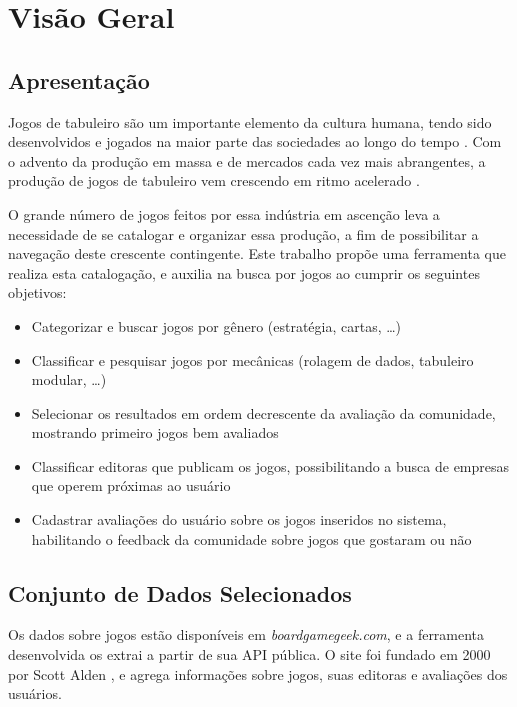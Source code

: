 \documentclass[hidelinks,12pt,article,twocolumn,brazil]{abntex2}
\def\bgg{\textit{boardgamegeek.com}}
\begin{document}
\imprimircapa

\section{Visão Geral}

\subsection{Apresentação}

Jogos de tabuleiro são um importante elemento da cultura humana, tendo sido desenvolvidos e jogados na maior parte das sociedades ao longo do tempo \cite{livingstone2019board}. Com o advento da produção em massa e de mercados cada vez mais abrangentes, a produção de jogos de tabuleiro vem crescendo em ritmo acelerado \cite{quinns2017youtube}.

O grande número de jogos feitos por essa indústria em ascenção leva a necessidade de se catalogar e organizar essa produção, a fim de possibilitar a navegação deste crescente contingente. Este trabalho propõe uma ferramenta que realiza esta catalogação, e auxilia na busca por jogos ao cumprir os seguintes objetivos:
\begin{itemize}
    \item Categorizar e buscar jogos por gênero (estratégia, cartas, \ldots)
    \item Classificar e pesquisar jogos por mecânicas (rolagem de dados, tabuleiro modular, \ldots)
    \item Selecionar os resultados em ordem decrescente da avaliação da comunidade, mostrando primeiro jogos bem avaliados
    \item Classificar editoras que publicam os jogos, possibilitando a busca de empresas que operem próximas ao usuário
    \item Cadastrar avaliações do usuário sobre os jogos inseridos no sistema, habilitando o feedback da comunidade sobre jogos que gostaram ou não
\end{itemize}

\subsection{Conjunto de Dados Selecionados}

Os dados sobre jogos estão disponíveis em \bgg, e a ferramenta desenvolvida os extrai a partir de sua API pública. O site foi fundado em 2000 por Scott Alden \cite{woods2012eurogames}, e agrega informações sobre jogos, suas editoras e avaliações dos usuários.
\end{document}
